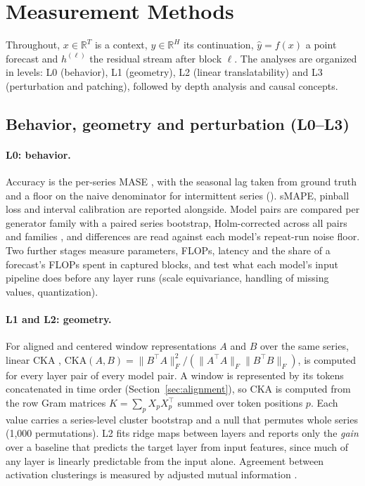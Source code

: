 \section{Measurement Methods}
\label{sec:methods}

Throughout, $x\in\mathbb{R}^{T}$ is a context, $y\in\mathbb{R}^{H}$ its continuation, $\hat y=f(x)$ a point forecast and
$h^{(\ell)}$ the residual stream after block $\ell$. The analyses are organized in levels: L0 (behavior), L1
(geometry), L2 (linear translatability) and L3 (perturbation and patching), followed by depth analysis and causal
concepts.

\subsection{Behavior, geometry and perturbation (L0--L3)}
\label{sec:l0}
\label{sec:l1l2}
\label{sec:l3}

\paragraph{L0: behavior.} Accuracy is the per-series MASE \citep{hyndman2006mase}, with the seasonal lag taken from
ground truth and a floor on the naive denominator for intermittent series (). sMAPE, pinball loss \citep{gneiting2007scoring} and interval calibration are reported alongside. Model
pairs are compared per generator family with a paired series bootstrap, Holm-corrected across all pairs and families
\citep{holm1979}, and differences are read against each model's repeat-run noise floor. Two further stages measure
parameters, FLOPs, latency and the share of a forecast's FLOPs spent in captured blocks, and test what each model's
input pipeline does before any layer runs (scale equivariance, handling of missing values, quantization).

\paragraph{L1 and L2: geometry.} For aligned and centered window representations $A$ and $B$ over the same series,
linear CKA \citep{kornblith2019cka},
$\mathrm{CKA}(A,B)=\|B^{\top}A\|_F^2/(\|A^{\top}A\|_F\|B^{\top}B\|_F)$, is computed for every layer pair of every
model pair. A window is represented by its tokens concatenated in time order (Section~\ref{sec:alignment}), so CKA is
computed from the row Gram matrices $K=\sum_p X_pX_p^{\top}$ summed over token positions $p$. Each value carries a
series-level cluster bootstrap and a null that permutes whole series (1{,}000 permutations). L2 fits ridge maps
between layers \citep{bansal2021stitching} and reports only the \emph{gain} over a baseline that predicts the target
layer from input features, since much of any layer is linearly predictable from the input alone. Agreement between activation clusterings
is measured by adjusted mutual information \citep{vinh2010ami}.

